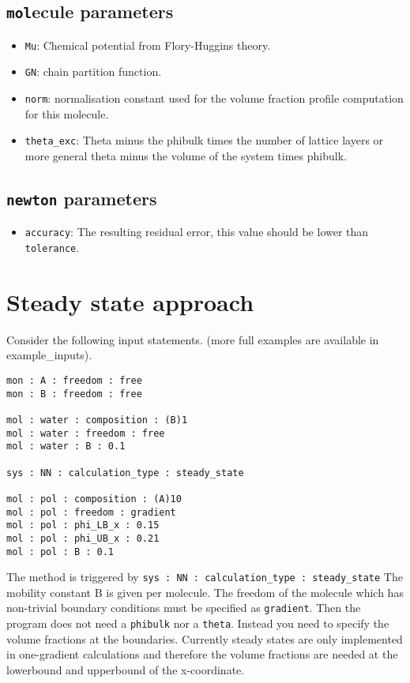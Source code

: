 \documentclass{article}
\begin{document}
\subsection{{\tt mol}ecule parameters}
\begin{itemize}
\item{\tt Mu}: Chemical potential from Flory-Huggins theory.
\item{\tt GN}: chain partition function.
\item{\tt norm}: normalisation constant used for the volume fraction profile computation for this molecule. 
\item{\tt theta\_exc}: Theta minus the phibulk times the number of lattice layers or more general theta minus the volume of the system times phibulk.

\end{itemize}

\subsection{{\tt newton} parameters}
\begin{itemize}

\item{\tt accuracy}: The resulting residual error, this value should be lower than {\tt tolerance}.

\end{itemize} %

\section {Steady state approach} 
\label{sec:steady_state}
Consider the following input statements. (more full examples are available in example\_inputs).
\begin{verbatim}
mon : A : freedom : free
mon : B : freedom : free

mol : water : composition : (B)1
mol : water : freedom : free
mol : water : B : 0.1

sys : NN : calculation_type : steady_state

mol : pol : composition : (A)10
mol : pol : freedom : gradient
mol : pol : phi_LB_x : 0.15
mol : pol : phi_UB_x : 0.21
mol : pol : B : 0.1
\end{verbatim} 

The method is triggered by {\tt sys : NN : calculation\_type : steady\_state}
The mobility constant B is given per molecule. The freedom of the molecule which has non-trivial boundary conditions must be specified as {\tt gradient}. Then the program does not need a {\tt phibulk} nor a {\tt theta}. Instead you need to specify the volume fractions at the boundaries. Currently steady states are only implemented in one-gradient calculations and therefore the volume fractions are needed at the lowerbound and upperbound of the x-coordinate.  
\end{document}
